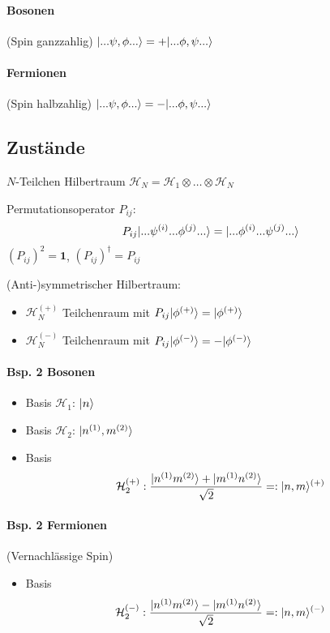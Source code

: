 \documentclass[11pt,a4paper]{report}
\begin{document}
\paragraph{Bosonen} (Spin ganzzahlig) $|...\psi, \phi ...\rangle = +|...\phi, \psi ...\rangle$
\paragraph{Fermionen} (Spin halbzahlig) $|...\psi, \phi ...\rangle = -|...\phi, \psi ...\rangle$

\subsection{Zustände}

\newcommand{\hil}{\mathcal{H}}

$N$-Teilchen Hilbertraum $\hil_N=\hil_1\otimes\ldots\otimes\hil_N$\par 

Permutationsoperator $P_{ij}$:
$$P_{ij}|...\psi^{(i)}...\phi^{(j)}...\rangle=|...\phi^{(i)}...\psi^{(j)}...\rangle$$
$(P_{ij})^2=\mathbf{1}$, $(P_{ij})^\dagger = P_{ij}$\par 
(Anti-)symmetrischer Hilbertraum:
\begin{itemize}
\item $\hil_N^{(+)}$ Teilchenraum mit $P_{ij}|\phi^{(+)}\rangle=|\phi^{(+)}\rangle$
\item $\hil_N^{(-)}$ Teilchenraum mit $P_{ij}|\phi^{(-)}\rangle=-|\phi^{(-)}\rangle$
\end{itemize}

\paragraph{Bsp. 2 Bosonen} 
\begin{itemize}
\item Basis $\hil_1$: $|n\rangle$
\item Basis $\hil_2$: $|n^{(1)},m^{(2)}\rangle$
\item Basis $$\hil_2^{(+)}: \frac{\ket{n^{(1)}m^{(2)}}+\ket{m^{(1)}n^{(2)}}}{\sqrt{2}}=:\ket{n,m}^{(+)}$$
\end{itemize}
\paragraph{Bsp. 2 Fermionen} (Vernachlässige Spin)
\begin{itemize}
\item Basis $$\hil_2^{(-)}: \frac{\ket{n^{(1)}m^{(2)}}-\ket{m^{(1)}n^{(2)}}}{\sqrt{2}}=:\ket{n,m}^{(-)}$$
\end{itemize}
\end{document}
